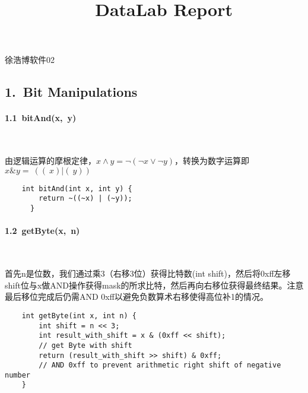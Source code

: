 \documentclass[UTF8]{ctexart}
\begin{document}
\renewcommand{\thefootnote}{\fnsymbol{footnote}}
\lstset{escapeinside=``}
\linespread{1.4}
\title{\vspace{-5em}\ \ DataLab Report\vspace{-2.5em}}
\date{}
\maketitle
\begin{center}
{\fangsong 徐浩博\quad 软件02}
\end{center}

\subsection*{1.\ Bit Manipulations}
\paragraph*{1.1\ bitAnd(x,\ y)}\ \par
由逻辑运算的摩根定律，$x \wedge y = \neg (\neg x \vee \neg y)$，转换为数字运算即$x\& y=~((~x)|(~y))$

\begin{lstlisting}
    int bitAnd(int x, int y) {
        return ~((~x) | (~y));
      }
\end{lstlisting}

\paragraph*{1.2\ getByte(x,\ n)}\ \par
首先n是位数，我们通过乘3（右移3位）获得比特数(int shift)，然后将0xff左移shift位与x做AND操作获得mask的所求比特，然后再向右移位获得最终结果。注意最后移位完成后仍需AND 0xff以避免负数算术右移使得高位补1的情况。
\begin{lstlisting}
    int getByte(int x, int n) {
        int shift = n << 3;
        int result_with_shift = x & (0xff << shift);
        // get Byte with shift
        return (result_with_shift >> shift) & 0xff;
        // AND 0xff to prevent arithmetic right shift of negative number
    }
\end{lstlisting}
\end{document}
